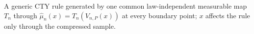 A generic CTY rule generated by one common law-independent measurable map \(T_n\) through \(\widehat\mu_n(x)=T_n(V_{n,P}(x))\) at every boundary point; \(x\) affects the rule only through the compressed sample.